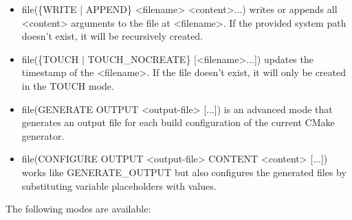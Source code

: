 \begin{itemize}
\item
file(\{WRITE | APPEND\} <filename> <content>...) writes or appends all <content> arguments to the file at <filename>. If the provided system path doesn’t exist, it will be recursively created.

\item
file(\{TOUCH | TOUCH\_NOCREATE\} [<filename>...]) updates the timestamp of the <filename>. If the file doesn’t exist, it will only be created in the TOUCH mode.

\item
file(GENERATE OUTPUT <output-file> [...]) is an advanced mode that generates an output file for each build configuration of the current CMake generator.

\item
file(CONFIGURE OUTPUT <output-file> CONTENT <content> [...]) works like GENERATE\_OUTPUT but also configures the generated files by substituting variable placeholders with values.
\end{itemize}


The following modes are available:

